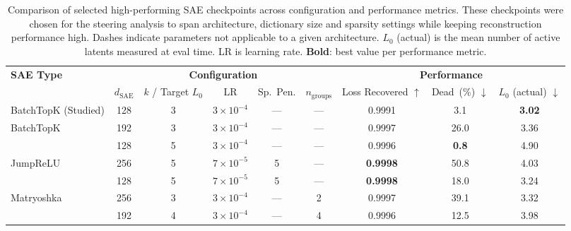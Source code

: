 \begin{table}[htbp]
\centering
\caption{Comparison of selected high-performing SAE checkpoints across configuration and performance metrics. These checkpoints were chosen for the steering analysis to span architecture, dictionary size and sparsity settings while keeping reconstruction performance high. Dashes indicate parameters not applicable to a given architecture. $L_0$ (actual) is the mean number of active latents measured at eval time. LR is learning rate. \textbf{Bold}: best value per performance metric.}
\label{tab:selected-saes}
\setlength{\tabcolsep}{3pt}
\begin{tabular}{l cc ccc ccc}
\toprule
\multirow{2}{*}{\textbf{SAE Type}}
  & \multicolumn{5}{c}{\textbf{Configuration}}
  & \multicolumn{3}{c}{\textbf{Performance}} \\
\cmidrule(lr){2-6}\cmidrule(lr){7-9}
  & $d_{\mathrm{SAE}}$
  & $k$ / Target $L_0$
  & LR %
  & Sp.\ Pen.
  & $n_{\mathrm{groups}}$
  & Loss Recovered $\uparrow$
  & Dead~(\%) $\downarrow$
  & $L_0$ (actual) $\downarrow$ \\
\midrule
BatchTopK (Studied)
  & 128 & 3 & $3\!\times\!10^{-4}$ & --- & --- & 0.9991 & 3.1 & \textbf{3.02} \\
\midrule
\multirow{2}{*}{BatchTopK}
  & 192 & 3 & $3\!\times\!10^{-4}$ & ---  & --- & 0.9997 & 26.0 & 3.36 \\
  & 128 & 5 & $3\!\times\!10^{-4}$ & ---  & --- & 0.9996 & \textbf{0.8} & 4.90 \\
\midrule
\multirow{2}{*}{JumpReLU}
  & 256 & 5 & $7\!\times\!10^{-5}$ & 5 & --- & \textbf{0.9998} & 50.8 & 4.03 \\
  & 128 & 5 & $7\!\times\!10^{-5}$ & 5 & --- & \textbf{0.9998} & 18.0 & 3.24 \\
\midrule
\multirow{2}{*}{Matryoshka}
  & 256 & 3 & $3\!\times\!10^{-4}$ & --- & 2 & 0.9997 & 39.1 & 3.32 \\
  & 192 & 4 & $3\!\times\!10^{-4}$ & --- & 4 & 0.9996 & 12.5 & 3.98 \\
\bottomrule
\end{tabular}
\end{table}

